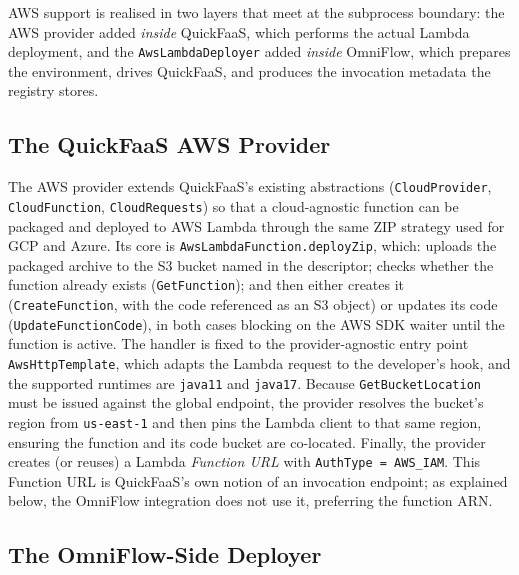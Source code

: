 AWS support is realised in two layers that meet at the subprocess boundary: the AWS provider added
\emph{inside} QuickFaaS, which performs the actual Lambda deployment, and the
\texttt{AwsLambdaDeployer} added \emph{inside} OmniFlow, which prepares the environment,
drives QuickFaaS, and produces the invocation metadata the registry stores.

\subsection{The QuickFaaS AWS Provider}
\label{subsec:quickfaas-aws-provider}

The AWS provider extends QuickFaaS's existing abstractions (\texttt{CloudProvider},
\texttt{CloudFunction}, \texttt{CloudRequests}) so that a cloud-agnostic function can be packaged
and deployed to AWS Lambda through the same ZIP strategy used for GCP and Azure. Its core is
\texttt{AwsLambdaFunction.deployZip}, which: uploads the packaged archive to the S3 bucket named in
the descriptor; checks whether the function already exists (\texttt{GetFunction}); and then either
creates it (\texttt{CreateFunction}, with the code referenced as an S3 object) or updates its code
(\texttt{UpdateFunctionCode}), in both cases blocking on the AWS SDK waiter until the function is
active. The handler is fixed to the provider-agnostic entry point \texttt{AwsHttpTemplate}, which
adapts the Lambda request to the developer's hook, and the supported runtimes are \texttt{java11}
and \texttt{java17}. Because \texttt{GetBucketLocation} must be issued against the global endpoint,
the provider resolves the bucket's region from \texttt{us-east-1} and then pins the Lambda client
to that same region, ensuring the function and its code bucket are co-located. Finally, the
provider creates (or reuses) a Lambda \emph{Function URL} with \texttt{AuthType = AWS\_IAM}. This
Function URL is QuickFaaS's own notion of an invocation endpoint; as explained below, the OmniFlow
integration does not use it, preferring the function ARN.

\subsection{The OmniFlow-Side Deployer}
\label{subsec:omniflow-aws-deployer}

